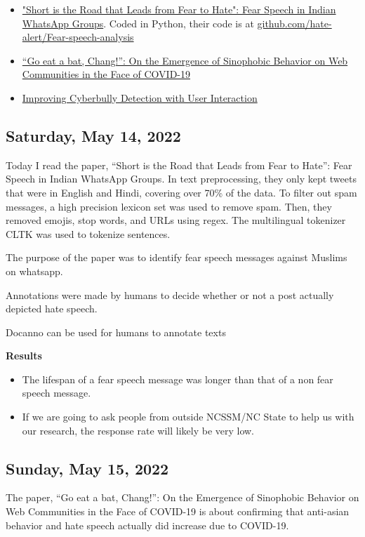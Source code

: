 \documentclass[11pt,letterpaper]{article}
\begin{document}
\begin{itemize}
    \item \href{https://arxiv.org/abs/2102.03870}{"Short is the Road that Leads from Fear to Hate": Fear Speech in Indian WhatsApp Groups}. Coded in Python, their code is at \href{https://github.com/hate-alert/Fear-speech-analysis}{github.com/hate-alert/Fear-speech-analysis}
    \item \href{https://arxiv.org/abs/2004.04046}{“Go eat a bat, Chang!”: On the Emergence of Sinophobic Behavior on Web Communities in the Face of COVID-19}
     \item \href{https://arxiv.org/pdf/2011.00449.pdf}{Improving Cyberbully Detection with User Interaction}
\end{itemize}

\subsection{Saturday, May 14, 2022}
Today I read the paper, “Short is the Road that Leads from Fear to Hate”: Fear Speech in Indian WhatsApp Groups. In text preprocessing, they only kept tweets that were in English and Hindi, covering over 70\% of the data. To filter out spam messages, a high precision lexicon set was used to remove spam. Then, they removed emojis, stop words, and URLs using regex. The multilingual tokenizer CLTK was used to tokenize sentences. 

The purpose of the paper was to identify fear speech messages against Muslims on whatsapp.

Annotations were made by humans to decide whether or not a post actually depicted hate speech.

Docanno can be used for humans to annotate texts

\textbf{Results}
\begin{itemize}
    \item The lifespan of a fear speech message was longer than that of a non fear speech message.
    \item If we are going to ask people from outside NCSSM/NC State to help us with our research, the response rate will likely be very low.
\end{itemize}

\subsection{Sunday, May 15, 2022}
The paper, “Go eat a bat, Chang!”: On the Emergence of Sinophobic Behavior on
Web Communities in the Face of COVID-19 is about confirming that anti-asian behavior and hate speech actually did increase due to COVID-19.
\end{document}
